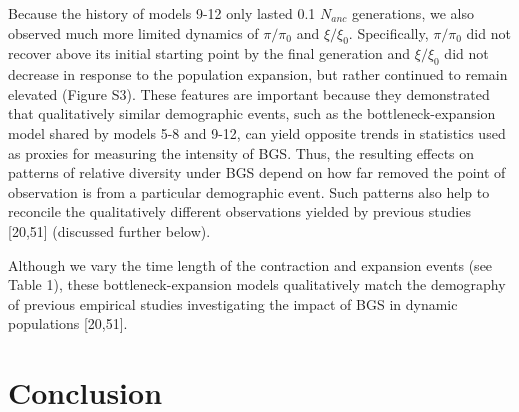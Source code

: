 \documentclass[9pt,twocolumn,twoside]{rilabRxiv}
\begin{document}
Because the history of models 9-12 only lasted 0.1
$N_{anc}$ generations, we also observed much more
limited dynamics of $\pi/\pi_0$ and $\xi/\xi_0$.
Specifically, $\pi/\pi_0$ did not recover above its initial
starting point by the final generation and $\xi/\xi_0$ did not
decrease in response to the population expansion, but rather continued
to remain elevated (Figure S3). These features are important because
they demonstrated that qualitatively similar demographic events, such as
the bottleneck-expansion model shared by models 5-8 and 9-12, can yield
opposite trends in statistics used as proxies for measuring the
intensity of BGS. Thus, the resulting effects on patterns of relative
diversity under BGS depend on how far removed the point of observation
is from a particular demographic event. Such patterns also help to
reconcile the qualitatively different observations yielded by previous
studies [20,51] (discussed further below).


Although we vary the time length of the contraction and expansion events (see Table 1), these bottleneck-expansion models qualitatively match the demography of previous empirical studies investigating the impact of BGS in dynamic populations [20,51]. 


\section{Conclusion}
\end{document}
